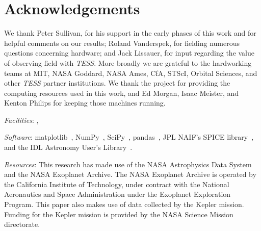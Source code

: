 \section*{Acknowledgements}
We thank Peter Sullivan, for his support in the early phases of this 
work and for helpful comments on our results;
Roland Vanderspek, for fielding numerous questions
concerning \tess hardware; and Jack Lissauer, for input regarding the value of observing 
\keplers field with \textit{TESS}.
More broadly we are grateful to the hardworking teams 
at MIT, NASA Goddard, NASA Ames, CfA, STScI, Orbital Sciences, and other \textit{TESS} partner institutions.
We thank the \tess project for providing the computing resources used in this work, and Ed 
Morgan, Isaac Meister, and Kenton Philips for keeping those machines running.

\vspace{0.5cm}
\textit{Facilities}: \tess\!, \kepler

\textit{Software}: matplotlib~\citep{hunter_matplotlib_2007}, NumPy~\citep{walt_numpy_2011}, SciPy~\citep{jones_scipy_2001}, pandas~\citep{mckinneypandas}, JPL NAIF's SPICE library~\citep{acton_SPICE_1996}, and the IDL Astronomy User's Library~\citep{landsman_idl_1995}.

\textit{Resources}: This research has made use of the NASA Astrophysics Data System and the NASA Exoplanet Archive. The NASA Exoplanet Archive is operated by the California Institute of Technology, under contract with the National Aeronautics and Space Administration under the Exoplanet Exploration Program.
This paper also makes use of data collected by the Kepler mission. Funding for the Kepler mission is provided by the NASA Science Mission directorate.
